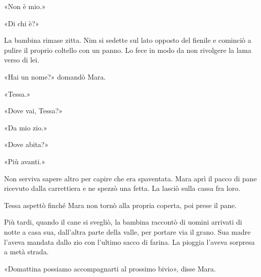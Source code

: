\documentclass[10pt,a4paper]{article}
\begin{document}
«Non è mio.»

«Di chi è?»

La bambina rimase zitta. Nim si sedette sul lato opposto del fienile e cominciò a pulire il proprio coltello con un panno. Lo fece in modo da non rivolgere la lama verso di lei.

«Hai un nome?» domandò Mara.

«Tessa.»

«Dove vai, Tessa?»

«Da mio zio.»

«Dove abita?»

«Più avanti.»

Non serviva sapere altro per capire che era spaventata. Mara aprì il pacco di pane ricevuto dalla carrettiera e ne spezzò una fetta. La lasciò sulla cassa fra loro.

Tessa aspettò finché Mara non tornò alla propria coperta, poi prese il pane.

Più tardi, quando il cane si svegliò, la bambina raccontò di uomini arrivati di notte a casa sua, dall'altra parte della valle, per portare via il grano. Sua madre l'aveva mandata dallo zio con l'ultimo sacco di farina. La pioggia l'aveva sorpresa a metà strada.

«Domattina possiamo accompagnarti al prossimo bivio», disse Mara.
\end{document}
